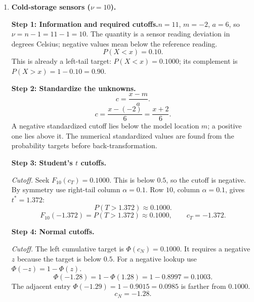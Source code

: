 \begin{enumerate}[leftmargin=*,label=\textbf{\arabic*.},itemsep=12pt,parsep=3pt,topsep=5pt]
\par\noindent\begin{minipage}{\linewidth}
\par\textbf{Step 6: Interpretation.}\nopagebreak\enspace An alert means revenue more than $5.396$ thousand dollars below plan or more than $5.599$ thousand dollars above plan (about $5.40$ below or $5.60$ above). Its probability is about $15.00\%$ under $t$ and $7.96\%$ under normal. The normal probability is lower by $0.0704$, or $7.04$ percentage points.
\end{minipage}\par
\item \begin{minipage}[t]{\linewidth}\textbf{Cold-storage sensors ($\nu=10$).}\nopagebreak
\par\textbf{Step 1: Information and required cutoffs.}\nopagebreak\enspace $n=11$, $m=-2$, $a=6$, so $\nu=n-1=11-1=10$. The quantity is a sensor reading deviation in degrees Celsius; negative values mean below the reference reading.\[
P(X<x)=0.10.
\]
This is already a left-tail target: $P(X<x)=0.1000$; its complement is $P(X>x)=1-0.10=0.90$.
\end{minipage}\par
\par\noindent\begin{minipage}{\linewidth}
\par\textbf{Step 2: Standardize the unknowns.}\nopagebreak\enspace \[
c=\frac{x-m}{a}.
\]
\[
c=\frac{x-(-2)}{6}=\frac{x+2}{6}.
\]
A negative standardized cutoff lies below the model location $m$; a positive one lies above it. The numerical standardized values are found from the probability targets before back-transformation.
\end{minipage}\par
\par\noindent\begin{minipage}{\linewidth}
\par\textbf{Step 3: Student's $t$ cutoffs.}\nopagebreak\enspace \par\textit{Cutoff.} Seek $F_{10}(c_{T})=0.1000$. This is below $0.5$, so the cutoff is negative. By symmetry use right-tail column $\alpha=0.1$. Row $10$, column $\alpha=0.1$, gives $t^*=1.372$:\[
P(T>1.372)\approx0.1000.
\]
\[
F_{10}(-1.372)=P(T>1.372)\approx0.1000,\qquad c_{T}=-1.372.
\]

\end{minipage}\par
\par\textbf{Step 4: Normal cutoffs.}\nopagebreak\enspace \par\noindent\begin{minipage}{\linewidth}
\par\textit{Cutoff.} The left cumulative target is $\Phi(c_{N})=0.1000$. It requires a negative $z$ because the target is below $0.5$. For a negative lookup use $\Phi(-z)=1-\Phi(z)$.\[
\Phi(-1.28)=1-\Phi(1.28)=1-0.8997=0.1003.
\]
The adjacent entry $\Phi(-1.29)=1-0.9015=0.0985$ is farther from $0.1000$.\[
c_{N}=-1.28.
\]
\end{minipage}\par


\end{enumerate}
